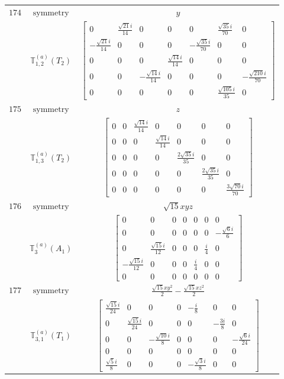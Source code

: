 \documentclass[fleqn,8pt,landscape]{jsarticle}
\begin{document}
\begin{longtable}{ccc}
$ 174 $ & $ \text{symmetry} $ & $ y $ \\
$  $ & $ \mathbb{T}_{1,2}^{(a)}(T_{2}) $ & $ \begin{bmatrix} 0 & \frac{\sqrt{21} i}{14} & 0 & 0 & 0 & \frac{\sqrt{35} i}{70} & 0 \\ - \frac{\sqrt{21} i}{14} & 0 & 0 & 0 & - \frac{\sqrt{35} i}{70} & 0 & 0 \\ 0 & 0 & 0 & \frac{\sqrt{14} i}{14} & 0 & 0 & 0 \\ 0 & 0 & - \frac{\sqrt{14} i}{14} & 0 & 0 & 0 & - \frac{\sqrt{210} i}{70} \\ 0 & 0 & 0 & 0 & 0 & \frac{\sqrt{105} i}{35} & 0 \end{bmatrix} $ \\ \hline
$ 175 $ & $ \text{symmetry} $ & $ z $ \\
$  $ & $ \mathbb{T}_{1,3}^{(a)}(T_{2}) $ & $ \begin{bmatrix} 0 & 0 & \frac{\sqrt{14} i}{14} & 0 & 0 & 0 & 0 \\ 0 & 0 & 0 & \frac{\sqrt{14} i}{14} & 0 & 0 & 0 \\ 0 & 0 & 0 & 0 & \frac{2 \sqrt{35} i}{35} & 0 & 0 \\ 0 & 0 & 0 & 0 & 0 & \frac{2 \sqrt{35} i}{35} & 0 \\ 0 & 0 & 0 & 0 & 0 & 0 & \frac{3 \sqrt{70} i}{70} \end{bmatrix} $ \\ \hline
$ 176 $ & $ \text{symmetry} $ & $ \sqrt{15} x y z $ \\
$  $ & $ \mathbb{T}_{3}^{(a)}(A_{1}) $ & $ \begin{bmatrix} 0 & 0 & 0 & 0 & 0 & 0 & 0 \\ 0 & 0 & 0 & 0 & 0 & 0 & - \frac{\sqrt{6} i}{6} \\ 0 & \frac{\sqrt{15} i}{12} & 0 & 0 & 0 & \frac{i}{4} & 0 \\ - \frac{\sqrt{15} i}{12} & 0 & 0 & 0 & \frac{i}{4} & 0 & 0 \\ 0 & 0 & 0 & 0 & 0 & 0 & 0 \end{bmatrix} $ \\ \hline
$ 177 $ & $ \text{symmetry} $ & $ \frac{\sqrt{15} x y^{2}}{2} - \frac{\sqrt{15} x z^{2}}{2} $ \\
$  $ & $ \mathbb{T}_{3,1}^{(a)}(T_{1}) $ & $ \begin{bmatrix} \frac{\sqrt{15} i}{24} & 0 & 0 & 0 & - \frac{i}{8} & 0 & 0 \\ 0 & \frac{\sqrt{15} i}{24} & 0 & 0 & 0 & - \frac{3 i}{8} & 0 \\ 0 & 0 & - \frac{\sqrt{10} i}{8} & 0 & 0 & 0 & - \frac{\sqrt{6} i}{24} \\ 0 & 0 & 0 & 0 & 0 & 0 & 0 \\ \frac{\sqrt{5} i}{8} & 0 & 0 & 0 & - \frac{\sqrt{3} i}{8} & 0 & 0 \end{bmatrix} $ \\ \hline

\end{longtable}
\end{document}
